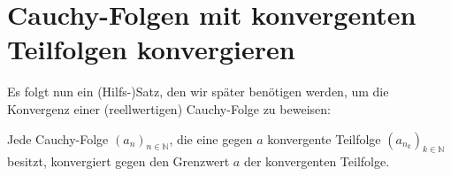 \documentclass[fontsize=9pt,
               parskip=half-,
               DIV=14,
               listof=chapterentry,
               tocflat]{scrbook}
\begin{document}
\section{Cauchy-Folgen mit konvergenten Teilfolgen konvergieren}

Es folgt nun ein (Hilfs-)Satz, den wir später benötigen werden, um die Konvergenz einer (reellwertigen) Cauchy-Folge zu beweisen:

\begin{theorem*}
Jede Cauchy-Folge $(a_{n})_{n\in \mathbb {N} }$, die eine gegen $a$ konvergente Teilfolge $\left(a_{n_{k}}\right)_{k\in \mathbb {N} }$ besitzt, konvergiert gegen den Grenzwert $a$ der konvergenten Teilfolge.

\end{theorem*}
\end{document}
